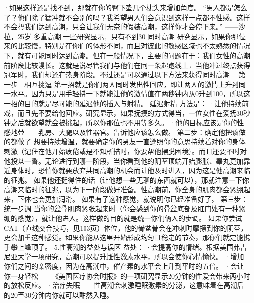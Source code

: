 \documentclass[12pt,UTF8]{ctexbook}
\begin{document}
·如果这样还是找不到，那就在你的臀下垫几个枕头来增加角度。
“男人都是怎么了？他们除了猛冲就不会别的吗？我希望男人们会意识到这样一点都不性感。这样不会帮我们达到高潮，只会让我们无奈的假装高潮，这样你才会停下来。”
——沙拉，25岁
多重高潮
一些研究显示，只有不到30%
同时高潮
研究显示，如果你那位来的比较慢，特别是在你们的体形不同，而且对彼此的敏感区域也不太熟悉的情况下，就有可能同时达到高潮。但在一般情况下，主要的问题在于：我们女性的高潮前阶段比较漫长。这就是说尽管我们与他们在同一条起跑线上，当他冲过终点获得冠军时，我们却还在热身阶段。不过还是可以通过以下方法来获得同时高潮：
第一步：相互挑逗
第一招就是你们两人同时发出性回应，即让两人的激情上升到同一水平。因为只是用手轻拂一下就能让他的激情值在两秒钟内从0升到100，所以这一招的目的就是尽可能的延迟他的插入与射精。
延迟射精
方法是：
·让他持续前戏，而且先不要给他回应。研究显示，如果抚摸的方式得当，一位女性在爱抚30秒钟之后就欲望就会被挑起，所以你那位也不用等多久。
·他的目标应该是你的性感地带——乳房、大腿以及性器官。告诉他应该怎么做。
第二步：确定他把该做的都做了
想要持续增温，就要确定你的男友一直遵照你的意思持续着对你的身体刺激（记住在他开始疲倦或是不知所措时，你要帮他摆脱困境）。而且还要不时对他投以一瞥。无论进行到哪一阶段，当你看到他的阴茎顶端开始膨胀、睾丸更加靠近身体时，恐怕你就要放弃共同高潮的机会而让他及时进入，因为这是他高潮来临的征兆。
如果他还挺得住的话（让他想一些无聊的东西就可以），那就注意一下你高潮来临时的征兆，以为下一阶段做好准备。性高潮前，你全身的肌肉都会紧绷起来，下体也会更加润滑。
如果有了这种感觉，就说明你已经准备好了。
第三步：统一步调
当你的盆骨肌肉紧张起来时（你会感到你的骨盆底部及肛门处有一种紧绷的感觉），就让他进入。这样做的目的就是统一你们俩人的步调。
如果你尝试CAT（直线交合技巧，见103页）体位，他的骨盆骨会在冲刺时摩擦到你的阴蒂，更会加重这种感觉。如果你能从这里开始形成均匀且稳定的节奏，那你们就定能携手攀上峰顶了。
5.性高潮的益处与误区
益处：
·会提高你的情绪。根据美国弗吉尼亚大学一项研究，高潮可以提升雌性激素水平，所以会使你心情愉快。
·增加你们之间的亲密度，因为在高潮中，催产素的水平会上升到平时的五倍。
·会让你一身轻松——《美国医疗协会时报》的一项研究显示20分钟的性爱会带来两小时的放松反应。
·治疗失眠——性高潮会刺激睡眠激素的分泌，这意味着在高潮后的20至30分钟内你就可以酣然入睡。
\end{document}
